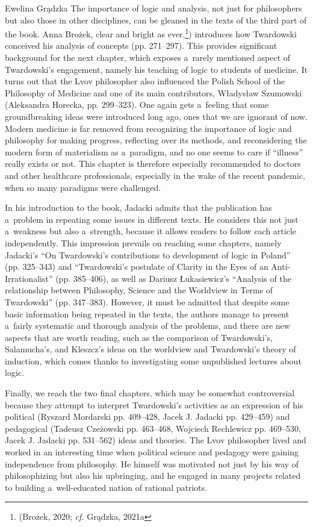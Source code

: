 \begin{newrevengenv}{Ewelina Grądzka}
The importance of logic and analysis, not just for philosophers but also those in other disciplines, can be gleaned in the texts of the third part of the book. Anna Brożek, clear and bright as ever,\footnote{(Brożek, 2020; \textit{cf.} Grądzka, 2021a}) introduces how Twardowski conceived his analysis of concepts (pp. 271–297). This provides significant background for the next chapter, which exposes a~rarely mentioned aspect of Twardowski's engagement, namely his teaching of logic to students of medicine. It turns out that the Lvov philosopher also influenced the Polish School of the Philosophy of Medicine and one of its main contributors, Władysław Szumowski (Aleksandra Horecka, pp. 299–323). One again gets a~feeling that some groundbreaking ideas were introduced long ago, ones that we are ignorant of now. Modern medicine is far removed from recognizing the importance of logic and philosophy for making progress, reflecting over its methods, and reconsidering the modern form of materialism as a~paradigm, and no one seems to care if ``illness'' really exists or not. This chapter is therefore especially recommended to doctors and other healthcare professionals, especially in the wake of the recent pandemic, when so many paradigms were challenged.

In his introduction to the book, Jadacki admits that the publication has a~problem in repeating some issues in different texts. He considers this not just a~weakness but also a~strength, because it allows readers to follow each article independently. This impression prevails on reaching some chapters, namely Jadacki's ``On Twardowski's contributions to development of logic in Poland'' (pp. 325–343) and ``Twardowski's postulate of Clarity in the Eyes of an Anti-Irrationalist'' (pp. 385–406), as well as Dariusz Łukasiewicz's ``Analysis of the relationship between Philosophy, Science and the Worldview in Terms of Twardowski'' (pp. 347–383). However, it must be admitted that despite some basic information being repeated in the texts, the authors manage to present a~fairly systematic and thorough analysis of the problems, and there are new aspects that are worth reading, such as the comparison of Twardowski's, Salamucha's, and Kleszcz's ideas on the worldview and Twardowski's theory of induction, which comes thanks to investigating some unpublished lectures about logic.

Finally, we reach the two final chapters, which may be somewhat controversial because they attempt to interpret Twardowski's activities as an expression of his political (Ryszard Mordarski pp. 409–428, Jacek J. Jadacki pp. 429–459) and pedagogical (Tadeusz Czeżowski pp. 463–468, Wojciech Rechlewicz pp. 469–530, Jacek J. Jadacki pp. 531–562) ideas and theories. The Lvov philosopher lived and worked in an interesting time when political science and pedagogy were gaining independence from philosophy. He himself was motivated not just by his way of philosophizing but also his upbringing, and he engaged in many projects related to building a~well-educated nation of rational patriots.


\end{newrevengenv}
